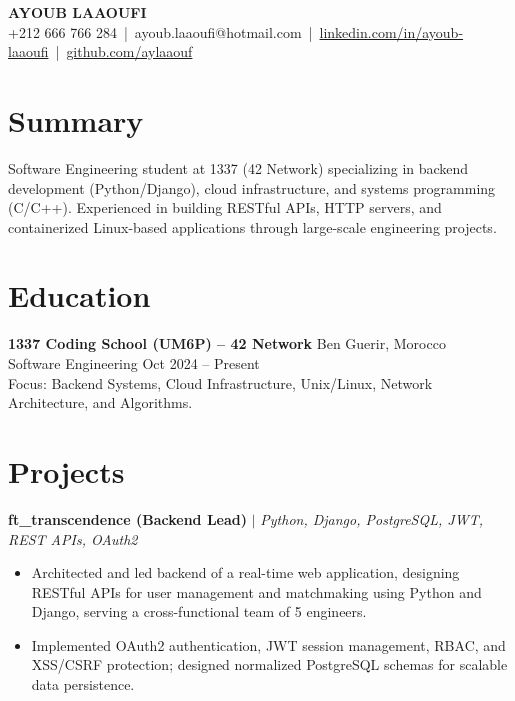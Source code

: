 \documentclass[9.5pt, a4paper]{article}
\begin{document}

\begin{center}
  {\large\bfseries AYOUB LAAOUFI}\\[3pt]
  {\small
    +212 666 766 284\ |\ ayoub.laaoufi@hotmail.com\ |\ 
    \href{https://linkedin.com/in/ayoub-laaoufi}{linkedin.com/in/ayoub-laaoufi}\ |\ 
    \href{https://github.com/aylaaouf}{github.com/aylaaouf}
  }
\end{center}
\vspace{1pt}

\section{Summary}
{\small Software Engineering student at 1337 (42 Network) specializing in backend development (Python/Django), cloud infrastructure, and systems programming (C/C++). Experienced in building RESTful APIs, HTTP servers, and containerized Linux-based applications through large-scale engineering projects.}

\section{Education}
{\small\textbf{1337 Coding School (UM6P) -- 42 Network} \hfill Ben Guerir, Morocco\\
Software Engineering \hfill Oct 2024 -- Present\\
Focus: Backend Systems, Cloud Infrastructure, Unix/Linux, Network Architecture, and Algorithms.}

\section{Projects}

{\small\textbf{ft\_transcendence (Backend Lead)} $|$ \textit{Python, Django, PostgreSQL, JWT, REST APIs, OAuth2}}
\begin{itemize}\small
  \item Architected and led backend of a real-time web application, designing RESTful APIs for user management and matchmaking using Python and Django, serving a cross-functional team of 5 engineers.
  \item Implemented OAuth2 authentication, JWT session management, RBAC, and XSS/CSRF protection; designed normalized PostgreSQL schemas for scalable data persistence.
\end{itemize}
\end{document}
